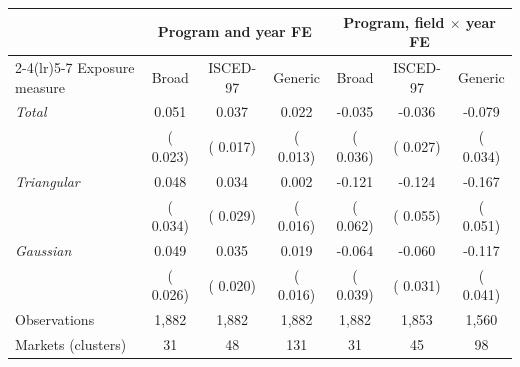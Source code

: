 \begin{tabular}{lcccccc}
\toprule
 & \multicolumn{3}{c}{Program and year FE} & \multicolumn{3}{c}{Program, field \(\times\) year FE} \\
\cmidrule(lr){2-4}\cmidrule(lr){5-7}
Exposure measure & Broad & ISCED-97 & Generic & Broad & ISCED-97 & Generic \\
\midrule
\textit{Total} &   0.051\sym{**} &   0.037\sym{**} &   0.022\sym{*} &  -0.035 &  -0.036 &  -0.079\sym{**} \\
 & ( 0.023) & ( 0.017) & ( 0.013) & ( 0.036) & ( 0.027) & ( 0.034) \\
\textit{Triangular} &   0.048 &   0.034 &   0.002 &  -0.121\sym{*} &  -0.124\sym{**} &  -0.167\sym{***} \\
 & ( 0.034) & ( 0.029) & ( 0.016) & ( 0.062) & ( 0.055) & ( 0.051) \\
\textit{Gaussian} &   0.049\sym{*} &   0.035\sym{*} &   0.019 &  -0.064 &  -0.060\sym{*} &  -0.117\sym{***} \\
 & ( 0.026) & ( 0.020) & ( 0.016) & ( 0.039) & ( 0.031) & ( 0.041) \\
\midrule
Observations &  1,882 &  1,882 &  1,882 &  1,882 &  1,853 &  1,560 \\
Markets (clusters) &     31 &     48 &    131 &     31 &     45 &     98 \\
\bottomrule
\end{tabular}

